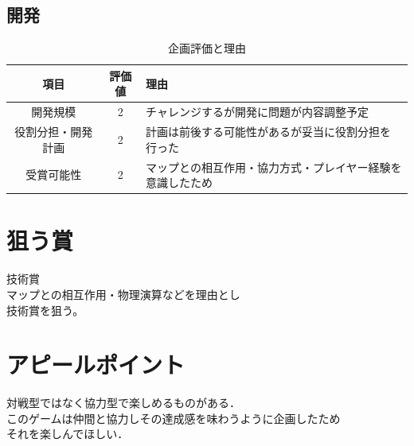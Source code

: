 \documentclass{jsarticle}
\begin{document}
\subsection{開発}
\begin{table}[hbt]
	\begin{center}
	\caption{企画評価と理由}
	\label{table3}
	\begin{tabular}{|c|c|l|}\hline
	項目 & 評価値 & 理由 \\ \hline\hline
	開発規模 & 2 & チャレンジするが開発に問題が内容調整予定 \\ \hline
	役割分担・開発計画 & 2 & 計画は前後する可能性があるが妥当に役割分担を行った　\\ \hline
	受賞可能性 & 2 & マップとの相互作用・協力方式・プレイヤー経験を意識したため \\ \hline
	\end{tabular}
	\end{center}
	\end{table}

	\section{狙う賞}
	技術賞\\
	マップとの相互作用・物理演算などを理由とし\\
	技術賞を狙う。

	\section{アピールポイント}
	対戦型ではなく協力型で楽しめるものがある．\\
	このゲームは仲間と協力しその達成感を味わうように企画したため\\
	それを楽しんでほしい．
\end{document}
